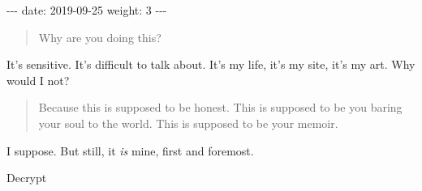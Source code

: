 -\/-\/- date: 2019-09-25 weight: 3 -\/-\/-

\begin{quote}
Why are you doing this?
\end{quote}

It's sensitive. It's difficult to talk about. It's my life, it's my site, it's my art. Why would I not?

\begin{quote}
Because this is supposed to be honest. This is supposed to be you baring your soul to the world. This is supposed to be your memoir.
\end{quote}

I suppose. But still, it \emph{is} mine, first and foremost.

Decrypt

\hypertarget{decrypted}{}
